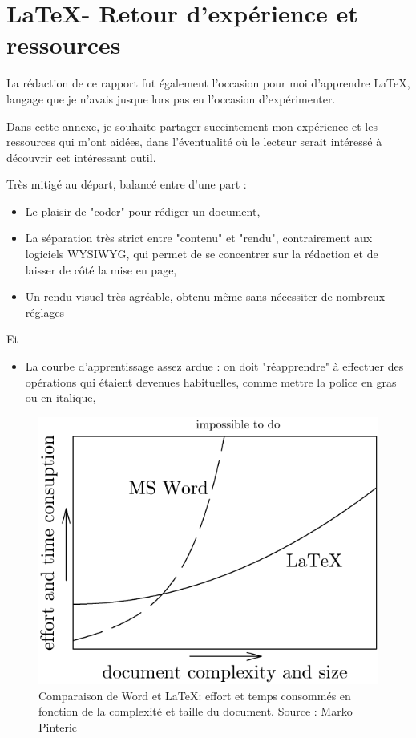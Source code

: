 \chapter{\LaTeX - Retour d'expérience et ressources} %

\label{AppendixA} %

La rédaction de ce rapport fut également l'occasion pour moi d'apprendre \LaTeX, langage que je n'avais jusque lors pas eu l'occasion d'expérimenter.

Dans cette annexe, je souhaite partager succintement mon expérience et les ressources qui m'ont aidées, dans l'éventualité où le lecteur serait intéressé à découvrir cet intéressant outil.

Très mitigé au départ, balancé entre d'une part :
\begin{itemize}
    \item Le plaisir de "coder" pour rédiger un document,
    \item La séparation très strict entre "contenu" et "rendu", contrairement aux logiciels WYSIWYG, qui permet de se concentrer sur la rédaction et de laisser de côté la mise en page,
    \item Un rendu visuel très agréable, obtenu même sans nécessiter de nombreux réglages
\end{itemize}
Et
\begin{itemize}
    \item La courbe d'apprentissage assez ardue : on doit "réapprendre" à effectuer des opérations qui étaient devenues habituelles, comme mettre la police en gras ou en italique,
\end{itemize}

\begin{figure}
    \centering
    \includegraphics[width=0.5\linewidth]{Figures/latex-vs-word.png}
    \caption{Comparaison de Word et \LaTeX : effort et temps consommés en fonction de la complexité et taille du document. Source : Marko Pinteric}
    \label{fig:latex-vs-word}
\end{figure}

